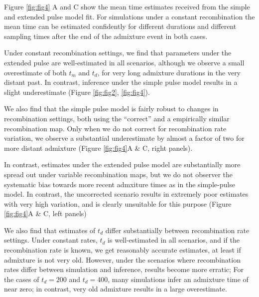\documentclass[]{article}
\begin{document}
Figure \ref{fig:fig4} A and C show the mean
time estimates received from the simple and extended pulse model fit. For simulations under a
constant recombination the mean time can be estimated confidently for different durations and different sampling times after the end of the admixture event in both cases. 

Under constant recombination settings, we find that parameters under the extended pulse are well-estimated in all scenarios, although we observe a small overestimate of both $t_m$ and $t_d$, for very long admixture durations in the very distant past. In contrast, inference under the simple pulse model results in a slight underestimate (Figure \ref{fig:fig2}, \ref{fig:fig4}).

We also find that the simple pulse model is fairly robust to changes in recombination settings, both using the ``correct'' and a empirically similar recombination map. Only when we do not correct for recombination rate variation, we observe a substantial underestimate by almost a factor of two for more distant admixture (Figure \ref{fig:fig4}A \& C, right panels). 

In contrast, estimates under the extended pulse model are substantially more spread out under variable recombination maps, but we do not observer the systematic bias towards more recent admxiture times as in the simple-pulse model. In contrast, the uncorrected scenario results in extremely poor estimates with very high variation, and is clearly unsuitable for this purpose (Figure \ref{fig:fig4}A \& C, left panels)

We also find that estimates of $t_d$ differ substantially between recombination rate settings. Under constant rates, $t_d$ is well-estimated in all scenarios, and if the recombination rate is known, we get reasonably accurate estimates, at least if admixture is not very old. However, under the scenarios where recombination rates differ between simulation and inference, results become more erratic; For the cases of $t_d=200$ and $t_d=400$, many simulations infer an admixture time of near zero; in contrast, very old admixture results in a large overestimate.
\end{document}
